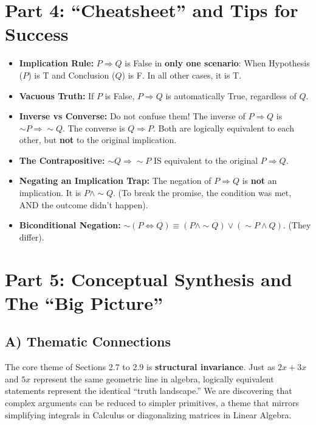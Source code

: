 \documentclass{article}
\begin{document}
\section*{Part 4: ``Cheatsheet'' and Tips for Success}

\begin{itemize}
    \item \textbf{Implication Rule:} $P \Rightarrow Q$ is False in \textbf{only one scenario}: When Hypothesis ($P$) is T and Conclusion ($Q$) is F. In all other cases, it is T.
    \item \textbf{Vacuous Truth:} If $P$ is False, $P \Rightarrow Q$ is automatically True, regardless of $Q$. 
    \item \textbf{Inverse vs Converse:} Do not confuse them! The inverse of $P \Rightarrow Q$ is $\sim P \Rightarrow \sim Q$. The converse is $Q \Rightarrow P$. Both are logically equivalent to each other, but \textbf{not} to the original implication.
    \item \textbf{The Contrapositive:} $\sim Q \Rightarrow \sim P$ IS equivalent to the original $P \Rightarrow Q$.
    \item \textbf{Negating an Implication Trap:} The negation of $P \Rightarrow Q$ is \textbf{not} an implication. It is $P \land \sim Q$. (To break the promise, the condition was met, AND the outcome didn't happen).
    \item \textbf{Biconditional Negation:} $\sim(P \Leftrightarrow Q) \equiv (P \land \sim Q) \lor (\sim P \land Q)$. (They differ).
\end{itemize}

\section*{Part 5: Conceptual Synthesis and The ``Big Picture''}

\subsection*{A) Thematic Connections}
The core theme of Sections 2.7 to 2.9 is \textbf{structural invariance}. Just as $2x + 3x$ and $5x$ represent the same geometric line in algebra, logically equivalent statements represent the identical ``truth landscape.'' We are discovering that complex arguments can be reduced to simpler primitives, a theme that mirrors simplifying integrals in Calculus or diagonalizing matrices in Linear Algebra.
\end{document}
